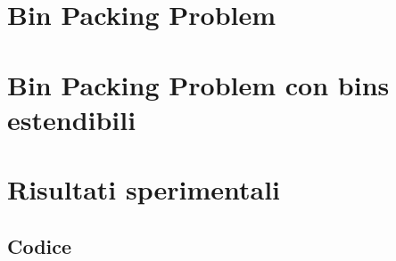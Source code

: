 \documentclass[a4paper]{report}
\begin{document}
\tableofcontents

\chapter{Bin Packing Problem}


\chapter{Bin Packing Problem con bins estendibili}


\chapter{Risultati sperimentali}


\printbibliography[heading=bibintoc]

\begin{appendices}
	\section*{Codice}
		\label{sec:Codice}
		\inputminted[linenos, breaklines, tabsize=2]{python3}{../SourceCode/Bin-Packing-Problem-Analysis.py}
\end{appendices}
\end{document}

